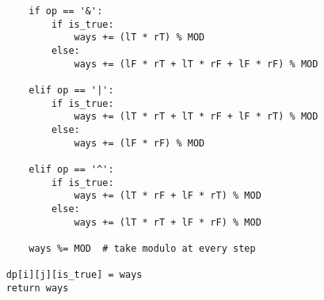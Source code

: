 \begin{verbatim}
        if op == '&':
            if is_true:
                ways += (lT * rT) % MOD
            else:
                ways += (lF * rT + lT * rF + lF * rF) % MOD

        elif op == '|':
            if is_true:
                ways += (lT * rT + lT * rF + lF * rT) % MOD
            else:
                ways += (lF * rF) % MOD

        elif op == '^':
            if is_true:
                ways += (lT * rF + lF * rT) % MOD
            else:
                ways += (lT * rT + lF * rF) % MOD

        ways %= MOD  # take modulo at every step

    dp[i][j][is_true] = ways
    return ways

\end{verbatim}

